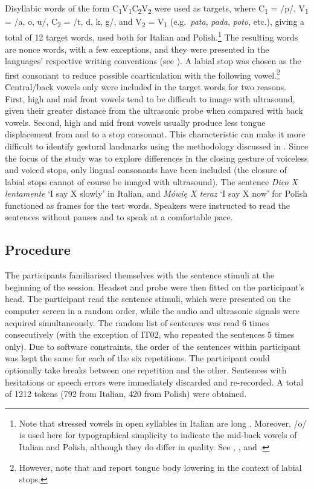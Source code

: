 \documentclass[
  12pt,
]{article}
\begin{document}
Disyllabic words of the form
C\textsubscript{1}V\textsubscript{1}C\textsubscript{2}V\textsubscript{2}
were used as targets, where C\textsubscript{1} = /p/, V\textsubscript{1}
= /a, o, u/, C\textsubscript{2} = /t, d, k, g/, and V\textsubscript{2} =
V\textsubscript{1} (e.g.~\emph{pata}, \emph{pada}, \emph{poto}, etc.),
giving a total of 12 target words, used both for Italian and
Polish.\footnote{Note that stressed vowels in open syllables in Italian are long \citep{renwick2016}. Moreover, /o/ is used here for typographical simplicity to indicate the mid-back vowels of Italian and Polish, although they do differ in quality. See \citet{kramer2009}, \citet{renwick2016}, and \citet{gussmann2007}.}
The resulting words are nonce words, with a few exceptions, and they
were presented in the languages' respective writing conventions (see
). A labial stop was chosen as the first consonant to
reduce possible coarticulation with the following
vowel.\footnote{However, note that \citet{westbury1983} and \citet{vazquez-alvarez2007} report tongue body lowering in the context of labial stops.}
Central/back vowels only were included in the target words for two
reasons. First, high and mid front vowels tend to be difficult to image
with ultrasound, given their greater distance from the ultrasonic probe
when compared with back vowels. Second, high and mid front vowels
usually produce less tongue displacement from and to a stop consonant.
This characteristic can make it more difficult to identify gestural
landmarks using the methodology discussed in . Since the
focus of the study was to explore differences in the closing gesture of
voiceless and voiced stops, only lingual consonants have been included
(the closure of labial stops cannot of course be imaged with
ultrasound). The sentence \emph{Dico X lentamente} `I say X slowly' in
Italian, and \emph{Mówię X teraz} `I say X now' for Polish functioned as
frames for the test words. Speakers were instructed to read the
sentences without pauses and to speak at a comfortable pace.

\hypertarget{procedure}{%
\subsection{Procedure}\label{procedure}}

The participants familiarised themselves with the sentence stimuli at
the beginning of the session. Headset and probe were then fitted on the
participant's head. The participant read the sentence stimuli, which
were presented on the computer screen in a random order, while the audio
and ultrasonic signals were acquired simultaneously. The random list of
sentences was read 6 times consecutively (with the exception of IT02,
who repeated the sentences 5 times only). Due to software constraints,
the order of the sentences within participant was kept the same for each
of the six repetitions. The participant could optionally take breaks
between one repetition and the other. Sentences with hesitations or
speech errors were immediately discarded and re-recorded. A total of
1212 tokens (792 from Italian, 420 from Polish) were obtained.
\end{document}
